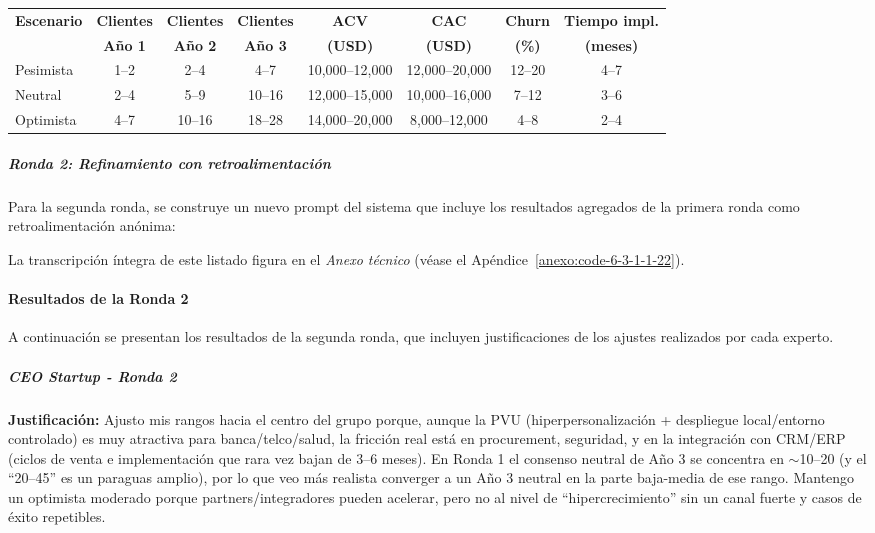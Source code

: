 \begin{center}
\footnotesize
\begin{adjustbox}{max width=\textwidth}
\begin{tabular}{|l|c|c|c|c|c|c|c|}
\hline
\textbf{Escenario} & \textbf{Clientes} & \textbf{Clientes} & \textbf{Clientes} & \textbf{ACV} & \textbf{CAC} & \textbf{Churn} & \textbf{Tiempo impl.} \\
& \textbf{Año 1} & \textbf{Año 2} & \textbf{Año 3} & \textbf{(USD)} & \textbf{(USD)} & \textbf{(\%)} & \textbf{(meses)} \\
\hline
Pesimista & 1--2 & 2--4 & 4--7 & 10,000--12,000 & 12,000--20,000 & 12--20 & 4--7 \\
\hline
Neutral & 2--4 & 5--9 & 10--16 & 12,000--15,000 & 10,000--16,000 & 7--12 & 3--6 \\
\hline
Optimista & 4--7 & 10--16 & 18--28 & 14,000--20,000 & 8,000--12,000 & 4--8 & 2--4 \\
\hline
\end{tabular}
\end{adjustbox}
\end{center}

\subparagraph{Ronda 2: Refinamiento con retroalimentación}

Para la segunda ronda, se construye un nuevo prompt del sistema que incluye los resultados agregados de la primera ronda como retroalimentación anónima:

La transcripción íntegra de este listado figura en el \textit{Anexo técnico} (véase el Apéndice~\ref{anexo:code-6-3-1-1-22}).

\paragraph{Resultados de la Ronda 2}

A continuación se presentan los resultados de la segunda ronda, que incluyen justificaciones de los ajustes realizados por cada experto.

\subparagraph{CEO Startup - Ronda 2}

\textbf{Justificación:} Ajusto mis rangos hacia el centro del grupo porque, aunque la PVU (hiperpersonalización + despliegue local/entorno controlado) es muy atractiva para banca/telco/salud, la fricción real está en procurement, seguridad, y en la integración con CRM/ERP (ciclos de venta e implementación que rara vez bajan de 3--6 meses). En Ronda 1 el consenso neutral de Año 3 se concentra en $\sim$10--20 (y el ``20--45'' es un paraguas amplio), por lo que veo más realista converger a un Año 3 neutral en la parte baja-media de ese rango. Mantengo un optimista moderado porque partners/integradores pueden acelerar, pero no al nivel de ``hipercrecimiento'' sin un canal fuerte y casos de éxito repetibles.

